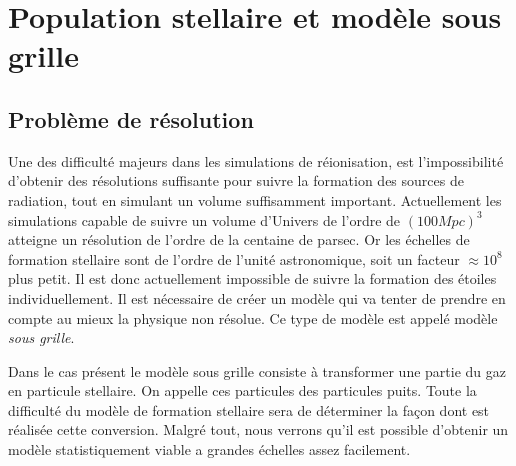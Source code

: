 \section{Population stellaire et modèle sous grille}

\subsection{Problème de résolution}

Une des difficulté majeurs dans les simulations de réionisation, est l'impossibilité d'obtenir des résolutions suffisante pour suivre la formation des sources de radiation, tout en simulant un volume suffisamment important.
Actuellement les simulations capable de suivre un volume d'Univers de l'ordre de $(100Mpc)^3$ atteigne un résolution de l'ordre de la centaine de parsec.
Or les échelles de formation stellaire sont de l'ordre de l'unité astronomique, soit un facteur $\approx 10^8$ plus petit.
Il est donc actuellement impossible de suivre la formation des étoiles individuellement.
Il  est nécessaire de créer un modèle qui va tenter de prendre en compte au mieux la physique non résolue.
Ce type de modèle est appelé modèle \textit{sous grille}.

Dans le cas présent le modèle sous grille consiste à transformer une partie du gaz en particule stellaire.
On appelle ces particules des particules puits.
Toute la difficulté du modèle de formation stellaire sera de déterminer la façon dont est réalisée cette conversion.
Malgré tout, nous verrons qu'il est possible d'obtenir un modèle statistiquement viable a grandes échelles assez facilement.




